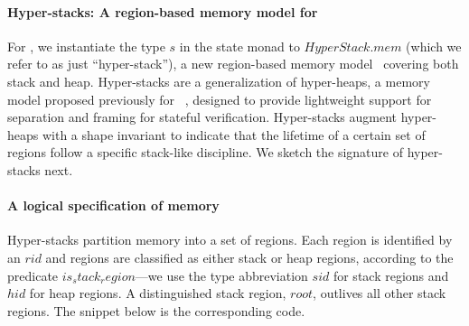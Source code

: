 

\paragraph{Hyper-stacks: A region-based memory model for \lowstar}
For \lowstar, we instantiate the type \lst$s$ in the state monad to
\lst$HyperStack.mem$ (which we refer to as just
``hyper-stack''), a new region-based memory model~\citep{tt97regions}
covering both stack and heap. Hyper-stacks are a
generalization of hyper-heaps, a memory model proposed previously for
\fstar~\cite{mumon}, designed to provide lightweight support for
separation and framing for stateful verification. 
%
Hyper-stacks augment hyper-heaps with a shape invariant to indicate
that the lifetime of a certain set of regions follow a specific
stack-like discipline. We sketch the \fstar signature of hyper-stacks
next.

\paragraph*{A logical specification of memory} Hyper-stacks partition
memory into a set of regions.
%
%
Each region is identified by an
\lst$rid$ and regions are classified as either stack or heap regions,
according to the predicate \lst$is_stack_region$---we use the type
abbreviation \lst$sid$ for stack regions and \lst$hid$ for heap
regions. A distinguished stack region, \lst$root$, outlives all other stack regions. The
snippet below is the corresponding \fstar code.

